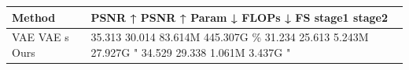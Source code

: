 \begin{tabular}{ll}
\toprule
Method & PSNR ↑ PSNR ↑ Param ↓ FLOPs ↓ FS stage1 stage2 \\
\midrule
VAE VAE s Ours & 35.313 30.014 83.614M 445.307G \% 31.234 25.613 5.243M 27.927G " 34.529 29.338 1.061M 3.437G " \\
\bottomrule
\end{tabular}
